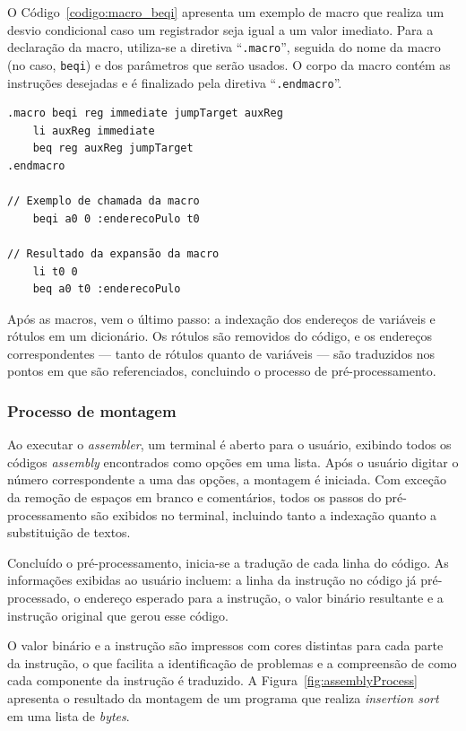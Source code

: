\documentclass[
	12pt,				%
	openright,			%
	oneside,			%
	a4paper,			%
	english,			%
	french,				%
	spanish,			%
	brazil,				%
	]{abntex2}
\begin{document}
O Código~\ref{codigo:macro_beqi} apresenta um exemplo de macro que realiza um desvio condicional caso um registrador seja igual a um valor imediato. Para a declaração da macro, utiliza-se a diretiva ``\texttt{.macro}'', seguida do nome da macro (no caso, \texttt{beqi}) e dos parâmetros que serão usados. O corpo da macro contém as instruções desejadas e é finalizado pela diretiva ``\texttt{.endmacro}''.

\begin{lstlisting}[caption={Exemplo de macro}, label={codigo:macro_beqi}]
.macro beqi reg immediate jumpTarget auxReg
    li auxReg immediate
    beq reg auxReg jumpTarget
.endmacro

// Exemplo de chamada da macro
    beqi a0 0 :enderecoPulo t0

// Resultado da expansão da macro
    li t0 0
    beq a0 t0 :enderecoPulo
\end{lstlisting}

Após as macros, vem o último passo: a indexação dos endereços de variáveis e rótulos em um dicionário. Os rótulos são removidos do código, e os endereços correspondentes — tanto de rótulos quanto de variáveis — são traduzidos nos pontos em que são referenciados, concluindo o processo de pré-processamento.

\subsubsection{Processo de montagem}

Ao executar o \textit{assembler}, um terminal é aberto para o usuário, exibindo todos os códigos \textit{assembly} encontrados como opções em uma lista. Após o usuário digitar o número correspondente a uma das opções, a montagem é iniciada. Com exceção da remoção de espaços em branco e comentários, todos os passos do pré-processamento são exibidos no terminal, incluindo tanto a indexação quanto a substituição de textos.

Concluído o pré-processamento, inicia-se a tradução de cada linha do código. As informações exibidas ao usuário incluem: a linha da instrução no código já pré-processado, o endereço esperado para a instrução, o valor binário resultante e a instrução original que gerou esse código.

O valor binário e a instrução são impressos com cores distintas para cada parte da instrução, o que facilita a identificação de problemas e a compreensão de como cada componente da instrução é traduzido. A Figura~\ref{fig:assemblyProcess} apresenta o resultado da montagem de um programa que realiza \textit{insertion sort} em uma lista de \textit{bytes}.
\end{document}
